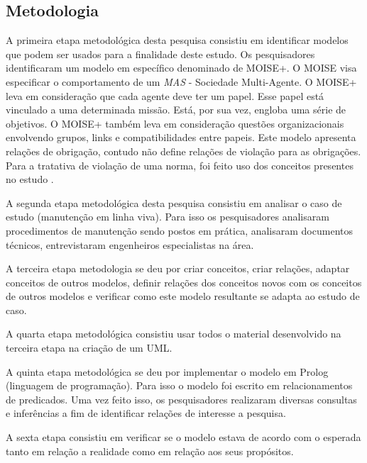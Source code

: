 \documentclass[a0,portrait]{a0poster}
\begin{document}
\begin{multicols}{2}

\section*{Metodologia}

A primeira etapa metodológica desta pesquisa consistiu em identificar modelos que podem ser
usados para a finalidade deste estudo. Os pesquisadores identificaram um modelo em específico 
denominado de MOISE+\cite{AutonomousAgent}. O MOISE visa especificar o comportamento de um 
\textit{MAS} - Sociedade Multi-Agente. O MOISE+ leva em consideração que cada agente deve ter
um papel. Esse papel está vinculado a uma determinada missão. Está, por sua vez, engloba 
uma série de objetivos. O MOISE+ também leva em consideração questões organizacionais envolvendo
grupos, links e compatibilidades entre papeis. Este modelo apresenta relações de obrigação,
contudo não define relações de violação para as obrigações. Para a tratativa de violação de uma
norma, foi feito uso dos conceitos presentes no estudo \cite{ControllingNonNormative}.

A segunda etapa metodológica desta pesquisa consistiu em analisar o caso de estudo (manutenção em linha viva).
Para isso os pesquisadores analisaram procedimentos de manutenção sendo postos em prática, analisaram 
documentos técnicos, entrevistaram engenheiros especialistas na área. 

A terceira etapa metodologia se deu por criar conceitos, criar relações, adaptar conceitos de outros modelos, 
definir relações dos conceitos novos com os conceitos de outros modelos e verificar como este modelo resultante
se adapta ao estudo de caso.

A quarta etapa metodológica consistiu usar todos o material desenvolvido na terceira etapa na criação 
de um UML.

A quinta etapa metodológica se deu por implementar o modelo em Prolog (linguagem de programação). Para isso
o modelo foi escrito em relacionamentos de predicados. Uma vez feito isso, os pesquisadores realizaram diversas
consultas e inferências a fim de identificar relações de interesse a pesquisa. 

A sexta etapa consistiu em verificar se o modelo estava de acordo com o esperada tanto em relação a realidade 
como em relação aos seus propósitos.


\end{multicols}
\end{document}
